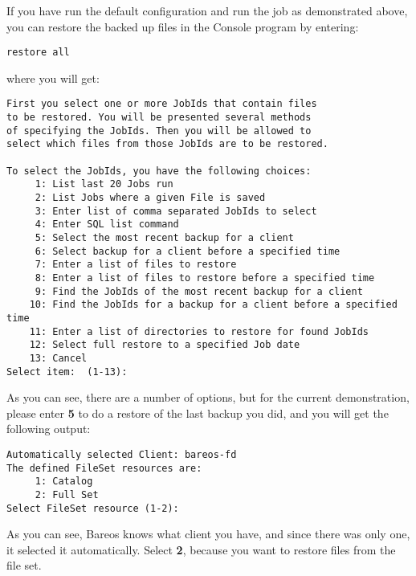 If you have run the default configuration and run the job as demonstrated above, 
you can restore the backed up files in the Console
program by entering:

\footnotesize
\begin{verbatim}
restore all
\end{verbatim}
\normalsize

where you will get:

\footnotesize
\begin{verbatim}
First you select one or more JobIds that contain files
to be restored. You will be presented several methods
of specifying the JobIds. Then you will be allowed to
select which files from those JobIds are to be restored.

To select the JobIds, you have the following choices:
     1: List last 20 Jobs run
     2: List Jobs where a given File is saved
     3: Enter list of comma separated JobIds to select
     4: Enter SQL list command
     5: Select the most recent backup for a client
     6: Select backup for a client before a specified time
     7: Enter a list of files to restore
     8: Enter a list of files to restore before a specified time
     9: Find the JobIds of the most recent backup for a client
    10: Find the JobIds for a backup for a client before a specified time
    11: Enter a list of directories to restore for found JobIds
    12: Select full restore to a specified Job date
    13: Cancel
Select item:  (1-13): 
\end{verbatim}
\normalsize

As you can see, there are a number of options, but for the current
demonstration, please enter {\bf 5} to do a restore of the last backup you
did, and you will get the following output:

\footnotesize
\begin{verbatim}
Automatically selected Client: bareos-fd
The defined FileSet resources are:
     1: Catalog
     2: Full Set
Select FileSet resource (1-2): 
\end{verbatim}
\normalsize

As you can see, Bareos knows what client
you have, and since there was only one, it selected it automatically.
Select {\bf 2}, because you want to restore files from the file set.

